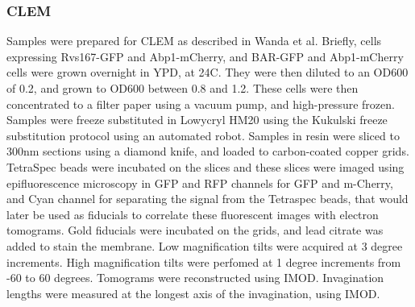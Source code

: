 \subsubsection{CLEM}
Samples were prepared for CLEM as described in Wanda et al. Briefly, cells expressing Rvs167-GFP and Abp1-mCherry, and BAR-GFP and Abp1-mCherry cells were grown overnight in YPD, at 24C. They were then diluted to an OD600 of 0.2, and grown to OD600 between 0.8 and 1.2. These cells were then concentrated to a filter paper using a vacuum pump, and high-pressure frozen. Samples were freeze substituted in Lowycryl HM20 using the Kukulski freeze substitution protocol using an automated robot. 
\vspace{2mm}
Samples in resin were sliced to 300nm sections using a diamond knife, and loaded to carbon-coated copper grids. TetraSpec beads were incubated on the slices and these slices were imaged using epifluorescence microscopy in GFP and RFP channels for GFP and m-Cherry, and Cyan channel for separating the signal from the Tetraspec beads, that would later be used as fiducials to correlate these fluorescent images with electron tomograms. 
\vspace{2mm}
Gold fiducials were incubated on the grids, and lead citrate was added to stain the membrane. Low magnification tilts were acquired at 3 degree increments. High magnification tilts were perfomed at 1 degree increments from -60 to 60 degrees. Tomograms were reconstructed using IMOD. Invagination lengths were measured at the longest axis of the invagination, using IMOD.



